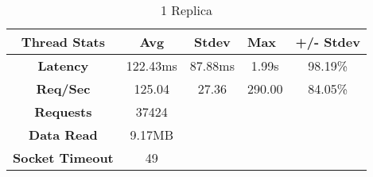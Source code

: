 \begin{table}[H]
\centering
\caption{1 Replica}
\begin{tabular}{|c|c|ccc}
\hline
\textbf{Thread Stats}   & \textbf{Avg} & \multicolumn{1}{c|}{\textbf{Stdev}} & \multicolumn{1}{l|}{\textbf{Max}} & \multicolumn{1}{l|}{\textbf{+/- Stdev}} \\ \hline
\textbf{Latency}        & 122.43ms     & \multicolumn{1}{c|}{87.88ms}        & \multicolumn{1}{c|}{1.99s}        & \multicolumn{1}{c|}{98.19\%}            \\ \hline
\textbf{Req/Sec}        & 125.04       & \multicolumn{1}{c|}{27.36}          & \multicolumn{1}{c|}{290.00}       & \multicolumn{1}{c|}{84.05\%}            \\ \hline
\textbf{Requests}       & 37424        &                                     &                                   &                                         \\ \cline{1-2}
\textbf{Data Read}      & 9.17MB       &                                     &                                   &                                         \\ \cline{1-2}
\textbf{Socket Timeout} & 49           &                                     &                                   &                                         \\ \cline{1-2}
\end{tabular}
\end{table}